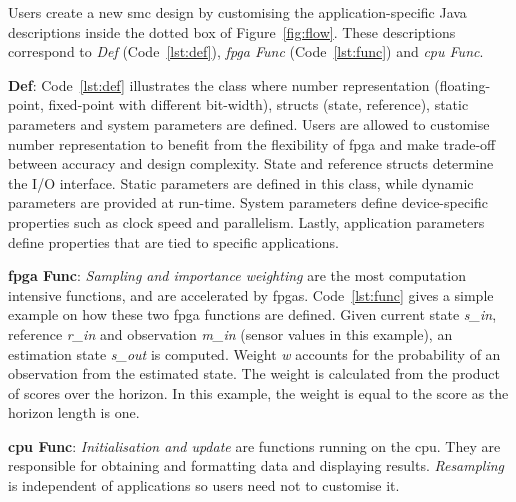 Users create a new \gls{smc} design by customising the application-specific Java descriptions inside the dotted box of Figure~\ref{fig:flow}.
These descriptions correspond to \textit{Def} (Code~\ref{lst:def}), \textit{\gls{fpga} Func} (Code~\ref{lst:func}) and \textit{\gls{cpu} Func}.

\textbf{Def}: Code~\ref{lst:def} illustrates the class where number representation (floating-point, fixed-point with different bit-width), structs (state, reference), static parameters and system parameters are defined.
Users are allowed to customise number representation to benefit from the flexibility of \gls{fpga} and make trade-off between accuracy and design complexity.
State and reference structs determine the I/O interface.
Static parameters are defined in this class, while dynamic parameters are provided at run-time.
System parameters define device-specific properties such as clock speed and parallelism.
Lastly, application parameters define properties that are tied to specific applications.

\textbf{\gls{fpga} Func}: \textit{Sampling and importance weighting} are the most computation intensive functions, and are accelerated by \glspl{fpga}.
Code~\ref{lst:func} gives a simple example on how these two \gls{fpga} functions are defined.
Given current state \textit{s\_in}, reference \textit{r\_in} and observation \textit{m\_in} (sensor values in this example), an estimation state \textit{s\_out} is computed.
Weight \textit{w} accounts for the probability of an observation from the estimated state.
The weight is calculated from the product of scores over the horizon.
In this example, the weight is equal to the score as the horizon length is one. 

\textbf{\gls{cpu} Func}: \textit{Initialisation and update} are functions running on the \gls{cpu}.
They are responsible for obtaining and formatting data and displaying results.
\textit{Resampling} is independent of applications so users need not to customise it.

